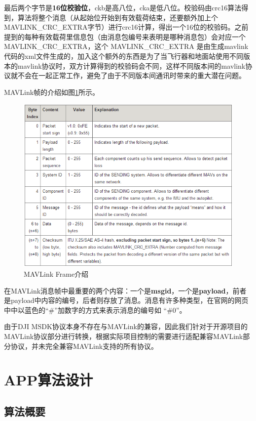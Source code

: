 最后两个字节是\textbf{16位校验位}，ckb是高八位，cka是低八位。校验码由crc16算法得到，算法将整个消息（从起始位开始到有效载荷结束，还要额外加上个MAVLINK\_CRC\_EXTRA字节）进行crc16计算，得出一个16位的校验码。之前提到的每种有效载荷里信息包（由消息包编号来表明是哪种消息包）会对应一个MAVLINK\_CRC\_EXTRA，这个 MAVLINK\_CRC\_EXTRA 是由生成mavlink代码的xml文件生成的，加入这个额外的东西是为了当飞行器和地面站使用不同版本的mavlink协议时，双方计算得到的校验码会不同，这样不同版本间的mavlink协议就不会在一起正常工作，避免了由于不同版本间通讯时带来的重大潜在问题。

MAVLink帧的介绍如图\ref{Fig:img8}所示。

\begin{figure}[ht]
  \centering
  \includegraphics[width=0.8\linewidth]{./Figure/Mavlink_Frame_Intro.png}
  \caption{MAVLink Frame介绍}\label{Fig:img8}
\end{figure}

在MAVLink消息帧中最重要的两个内容：一个是\textbf{msgid}，一个是\textbf{payload}，前者是payload中内容的编号，后者则存放了消息。消息有许多种类型，在官网的网页中中以蓝色的“\#”加数字的方式来表示消息的编号如 “\#0”。

由于DJI MSDK协议本身不存在与MAVLink的兼容，因此我们针对于开源项目的MAVLink协议部分进行转换，根据实际项目控制的需要进行适配兼容MAVLink部分协议，并未完全兼容MAVLink支持的所有协议。

\chapter{APP算法设计}

\section{算法概要}

